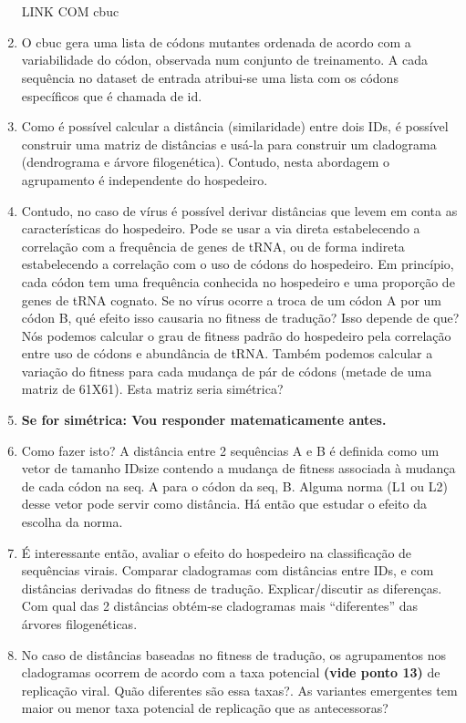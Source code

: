\documentclass[12pt]{article}
\begin{document}
\begin{enumerate}
          \\\\ LINK COM \gls{cbuc} \\
    \item O \gls{cbuc} gera uma lista de códons mutantes ordenada de acordo com a variabilidade do códon, observada num conjunto de treinamento. A cada sequência no dataset de entrada atribui-se uma lista com os códons específicos que é chamada de id.
    \item Como é possível calcular a distância (similaridade) entre dois IDs, é possível construir uma matriz de distâncias e usá-la para construir um cladograma (dendrograma e árvore filogenética). Contudo, nesta abordagem o agrupamento é independente do hospedeiro.
    \item Contudo, no caso de vírus é possível derivar distâncias que levem em conta as características do hospedeiro. Pode se usar a via direta estabelecendo a correlação com a frequência de genes de tRNA, ou de forma indireta estabelecendo a correlação com o uso de códons do hospedeiro. Em princípio, cada códon tem uma frequência conhecida no hospedeiro e uma proporção de genes de tRNA cognato. Se no vírus ocorre a troca de um códon A por um códon B, qué efeito isso causaria no fitness de tradução? Isso depende de que? Nós podemos calcular o grau de fitness padrão do hospedeiro pela correlação entre uso de códons e abundância de tRNA. Também podemos calcular a variação do fitness para cada mudança de pár de códons (metade de uma matriz de 61X61). Esta matriz seria simétrica?
    \item \textbf{Se for simétrica: Vou responder matematicamente antes.}
    \item Como fazer isto? A distância entre 2 sequências A e B é definida como um vetor de tamanho IDsize contendo a mudança de fitness associada à mudança de cada códon na seq. A para o códon da seq, B. Alguma norma (L1 ou L2) desse vetor pode servir como distância. Há então que estudar o efeito da escolha da norma.
    \item É interessante então, avaliar o efeito do hospedeiro na classificação de sequências virais. Comparar cladogramas com distâncias entre IDs, e com distâncias derivadas do fitness de tradução. Explicar/discutir as diferenças. Com qual das 2 distâncias obtém-se cladogramas mais “diferentes” das árvores filogenéticas.
    \item No caso de distâncias baseadas no fitness de tradução, os agrupamentos nos cladogramas ocorrem de acordo com a taxa potencial \textbf{(vide ponto 13)} de replicação viral. Quão diferentes são essa taxas?. As variantes emergentes tem maior ou menor taxa potencial de replicação que as antecessoras?
\end{enumerate}
\end{document}
